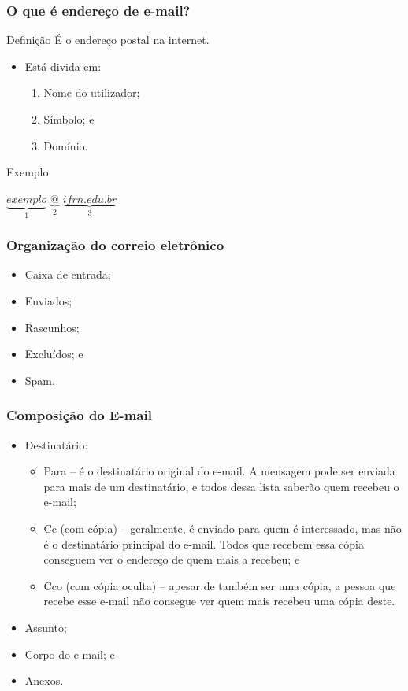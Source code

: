 \documentclass[aspectratio=169]{beamer} %
\begin{document}
\begin{frame}
	\frametitle{O que é endere\c co de e-mail?}

	\begin{block}{Defini\c cão}
		É o endere\c co postal na internet.
	\end{block} \vfill
	
	\begin{itemize}
		\item Está divida em: 
			\begin{enumerate}
				\item Nome do utilizador; 
				\item Símbolo;  e
				\item Domínio. 
			\end{enumerate}				
	\end{itemize} \vfill
	
	\begin{exampleblock}{Exemplo}
		\begin{center}
			$\underbrace{exemplo}_{1}$ $\underbrace{@}_{2}$ $\underbrace{ifrn.edu.br}_{3}$
		\end{center}
	\end{exampleblock}
\end{frame}

\begin{frame}
	\frametitle{Organiza\c cão do correio eletrônico}

	\begin{itemize}
		\item Caixa de entrada;
		\item Enviados;
		\item Rascunhos;
		\item Excluídos; e
		\item Spam.
	\end{itemize}
\end{frame}

\begin{frame}
	\frametitle{Composi\c cão do E-mail}

	\begin{itemize}
		\item Destinatário:
		\begin{itemize}
			\item Para -- é o destinatário original do e-mail. A mensagem pode ser enviada para mais de um destinatário, e todos dessa lista saberão quem recebeu o e-mail;
			\item Cc (com cópia) -- geralmente, é enviado para quem é interessado, mas não é o destinatário principal do e-mail. Todos que recebem essa cópia conseguem ver o endereço de quem mais a recebeu; e
			\item Cco (com cópia oculta) -- apesar de também ser uma cópia, a pessoa que recebe esse e-mail não consegue ver quem mais recebeu uma cópia deste.
		\end{itemize}
		\item Assunto;
		\item Corpo do e-mail; e
		\item Anexos.
	\end{itemize}
\end{frame}
\end{document}
